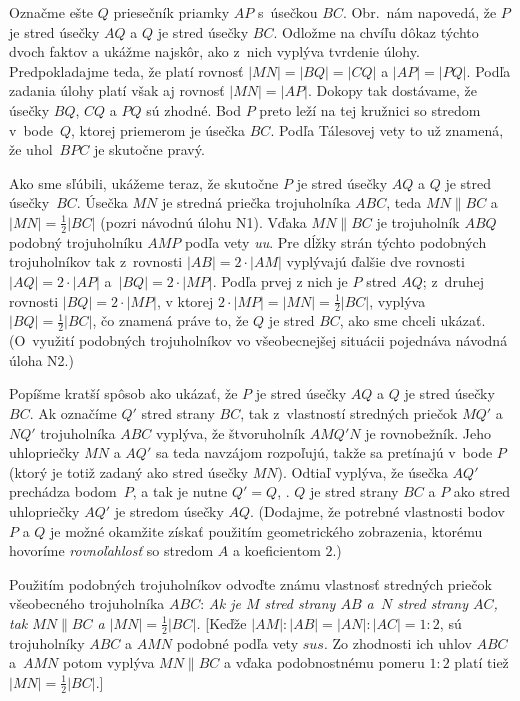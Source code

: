 {%
Označme ešte $Q$ priesečník priamky $AP$ s~úsečkou $BC$.
Obr.\,\obrnum{} nám napovedá, že $P$ je stred úsečky $AQ$ a
$Q$ je stred úsečky $BC$. Odložme na chvíľu dôkaz týchto dvoch faktov
a ukážme najskôr, ako z~nich vyplýva tvrdenie úlohy.
%
Predpokladajme teda, že platí rovnosť
$|MN|=|BQ|=|CQ|$ a $|AP|=|PQ|$.
Podľa zadania úlohy platí však aj rovnosť $|MN|=|AP|$. Dokopy tak
dostávame, že úsečky $BQ$, $CQ$ a $PQ$ sú zhodné. Bod $P$ preto
leží na tej kružnici so stredom v~bode~$Q$, ktorej priemerom
je úsečka $BC$. Podľa Tálesovej vety to už znamená, že
uhol~$BPC$ je skutočne pravý.

Ako sme sľúbili, ukážeme teraz, že skutočne $P$ je stred úsečky $AQ$ a
$Q$ je stred úsečky~$BC$. Úsečka $MN$ je stredná priečka trojuholníka $ABC$,
teda $MN\parallel BC$ a~$|MN|=\frac12|BC|$ (pozri návodnú úlohu N1).
Vďaka $MN\parallel BC$
je trojuholník $ABQ$ podobný trojuholníku $AMP$ podľa vety \emph{uu}. Pre dĺžky
strán týchto podobných trojuholníkov tak z~rovnosti $|AB|=2\cdot|AM|$
vyplývajú ďalšie dve rovnosti $|AQ|=2\cdot|AP|$ a~$|BQ|={2\cdot|MP|}$.
Podľa prvej z nich je $P$ stred $AQ$; z~druhej rovnosti
$|BQ|={2\cdot|MP|}$, v ktorej $2\cdot|MP|=|MN|=\frac12|BC|$,
vyplýva $|BQ|=\frac12|BC|$, čo znamená práve to, že $Q$ je stred
$BC$, ako sme chceli ukázať. (O~využití podobných trojuholníkov
vo všeobecnejšej situácii pojednáva návodná úloha N2.)

\poznamka
Popíšme kratší spôsob ako ukázať, že $P$ je stred úsečky $AQ$ a
$Q$ je stred úsečky~$BC$. Ak označíme $Q'$ stred strany $BC$, tak
z~vlastností stredných priečok $MQ'$ a~$NQ'$ trojuholníka $ABC$ vyplýva, že
štvoruholník $AMQ'N$ je rovnobežník. Jeho uhlopriečky $MN$ a $AQ'$ sa
teda navzájom rozpoľujú, takže sa pretínajú v~bode $P$ (ktorý je
totiž zadaný ako stred úsečky $MN$). Odtiaľ vyplýva, že úsečka $AQ'$
prechádza bodom~$P$, a tak je nutne $Q'=Q$, \tj. $Q$ je stred
strany $BC$ a $P$ ako stred uhlopriečky $AQ'$ je stredom
úsečky $AQ$. (Dodajme, že potrebné vlastnosti bodov $P$ a $Q$ je možné
okamžite získať použitím geometrického zobrazenia, ktorému hovoríme
{\it rovnoľahlosť\/} so stredom $A$ a koeficientom $2$.)

Použitím podobných trojuholníkov odvoďte známu vlastnosť stredných priečok
všeobecného trojuholníka $ABC$: {\sl Ak je $M$ stred strany $AB$ a~$N$ stred strany $AC$, tak $MN\parallel BC$ a $|MN|=\frac12|BC|$.}
[Keďže $|AM|:|AB|=|AN|:|AC|=1:2$, sú trojuholníky $ABC$ a $AMN$ podobné
podľa vety $sus$. Zo zhodnosti ich uhlov $ABC$ a~$AMN$ potom vyplýva
$MN\parallel BC$ a vďaka podobnostnému pomeru $1:2$ platí tiež
$|MN|=\frac12|BC|$.]

}

